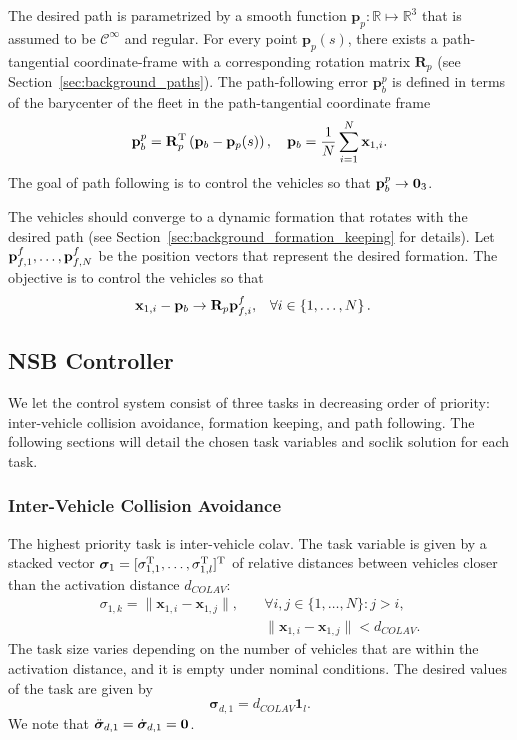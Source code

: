 The desired path is parametrized by a smooth function $\mathbf{p}_p : \mathbb{R} \mapsto \mathbb{R}^3$ that is assumed to be $\mathcal{C}^\infty$ and regular.
For every point $\mathbf{p}_p(s)$, there exists a path-tangential coordinate-frame with a corresponding rotation matrix $\mathbf{R}_p$ (see Section~\ref{sec:background_paths}). 
The path-following error $\mathbf{p}_b^p$ is defined in terms of the barycenter of the fleet in the path-tangential coordinate frame
\begin{equation}
    \mathbf{p}_b^p = \mathbf{R}_p^{\mathrm{T}}\left(\mathbf{p}_b - \mathbf{p}_p(s)\right), \quad \mathbf{p}_b = \frac{1}{N}\sum_{i=1}^N \mathbf{x}_{1,i}.
\end{equation}
The goal of path following is to control the vehicles so that $\mathbf{p}_b^p \rightarrow \mathbf{0}_3$.

The vehicles should converge to a dynamic formation that rotates with the desired path (see Section~\ref{sec:background_formation_keeping} for details).
Let $\mathbf{p}_{f,1}^f, \ldots, \mathbf{p}_{f,N}^f$ be the position vectors that represent the desired formation.
The objective is to control the vehicles so that
\begin{align}
    \mathbf{x}_{1,i} - \mathbf{p}_b &\rightarrow \mathbf{R}_p \mathbf{p}_{f,i}^f, &
    \forall i &\in \left\{1, \ldots, N \right\}.
\end{align}

\subsection{NSB Controller}\label{sec:NSB_case_study}

We let the control system consist of three tasks in decreasing order of priority: inter-vehicle collision avoidance, formation keeping, and path following. The following sections will detail the chosen task variables and \gls{soclik} solution for each task.

\subsubsection{Inter-Vehicle Collision Avoidance}

The highest priority task is inter-vehicle \acrfull{colav}. The task variable is given by a stacked vector $\bm{\sigma}_1 = [\sigma_{1,1}^{\mathrm{T}}, \ldots, \sigma_{1,l}^{\mathrm{T}}]^{\mathrm{T}}$ of relative distances between vehicles closer than the activation distance $d_{COLAV}$:
\begin{equation}
\begin{split}
    \sigma_{1,k} = \|\mathbf{x}_{1,i} - \mathbf{x}_{1,j}\|, \quad &\forall i,j \in \{1, \ldots, N\}: j > i,\\
    &\|\mathbf{x}_{1,i} - \mathbf{x}_{1,j}\| < d_{COLAV}.
    \end{split}
\end{equation}
The task size varies depending on the number of vehicles that are within the activation distance, and it is empty under nominal conditions. The desired values of the task are given by
\begin{equation}
    \bm{\sigma}_{d,1} = d_{COLAV} \mathbf{1}_l.
\end{equation}
We note that $\ddot{\bm{\sigma}}_{d,1} = \dot{\bm{\sigma}}_{d,1}= \mathbf{0}$.

